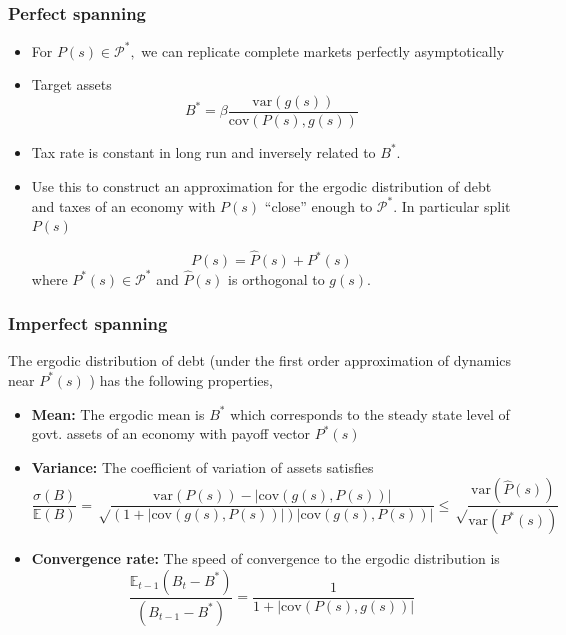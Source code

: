 \documentclass{beamer}
\newcommand{\EE}{\mathbb E}
\newcommand{\var}{\mathrm{var}}
\newcommand{\cov}{\mathrm{cov}}
\begin{document}
\begin{frame}%

\frametitle{Perfect spanning}\label{linearization}

\begin{itemize}
\item \smallskip For $P(s)\in \mathcal{P}^{\ast },$ we can
replicate complete markets perfectly asymptotically

\item Target assets%
\begin{equation*}
B^{\ast }=\beta \frac{\mathrm{var}(g(s))}{\mathrm{cov}(P(s),g(s))}
\end{equation*}

\item Tax rate is constant in long run and inversely related to $B^*$.


\item Use this to construct an approximation for the ergodic distribution of debt and taxes of an economy with $P(s)$ ``close'' enough to $\mathcal{P}^*$. In particular split $P(s)$

\[P(s)=\hat{P}(s)+P^*(s)\] where $P^*(s)\in \mathcal{P}^*$ and $\hat{P}(s)$ is orthogonal to $g(s)$. 
\hyperlink{linear appendix}{}
\end{itemize}
\end{frame}%


\begin{frame}%

\frametitle{Imperfect spanning}
\begin{theorem}

The ergodic distribution of debt (under the first order approximation of dynamics near $P^*(s)$ ) has the following properties,
\begin{itemize}
 \item \textbf{Mean:} The ergodic mean is $B^*$ which corresponds to the steady state level of govt. assets of an economy with payoff vector $P^*(s)$
  
 \item \textbf{Variance:} The coefficient of variation of assets satisfies
  \[
    \frac{\sigma(B)}{\mathbb E(B)} = \sqrt\frac{\var(P(s)) - |\cov(g(s),P(s))|}{(1+|\cov(g(s),P(s))|)|\cov(g(s),P(s))|}\leq\sqrt\frac{\var(\hat{P}(s))}{\var(P^*(s))}
  \]
  \item \textbf{Convergence rate:} The speed of convergence to the ergodic distribution is
  \[
    \frac{\EE_{t-1}(B_t-B^*)}{(B_{t-1} - B^*)} = \frac1{1+|\cov(P(s),g(s))|}
  \]

\end{itemize}
  

\end{theorem}

\end{frame}%
\end{document}
